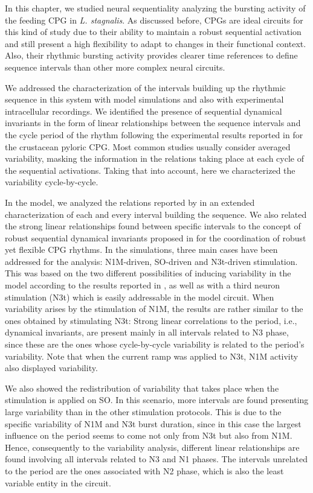 In this chapter, we studied neural sequentiality analyzing the bursting activity of the feeding CPG in \textit{L. stagnalis}. As discussed before, CPGs are ideal circuits for this kind of study due to their ability to maintain a robust sequential activation and still present a high flexibility to adapt to changes in their functional context. Also, their rhythmic bursting activity provides clearer time references to define sequence intervals than other more complex neural  circuits. 

We addressed the characterization of the intervals building up the rhythmic sequence in this system with model simulations and also with experimental intracellular recordings. We identified the presence of sequential dynamical invariants in the form of linear relationships between the sequence intervals and the cycle period of the rhythm following the experimental results reported in \textcite{elices_robust_2019} for the crustacean pyloric CPG. Most common studies usually consider averaged variability, masking the information in the relations taking place at each cycle of the sequential activations. Taking that into account, here we characterized the variability cycle-by-cycle. 

In the model, we analyzed the relations reported by \textcite{elliott_temporal_1991} in an extended characterization of each and every interval building the sequence. We also related the strong linear relationships found between specific intervals to the concept of robust sequential dynamical invariants proposed in \textcite{elices_robust_2019} for the coordination of robust yet flexible CPG rhythms. In the simulations, three main cases have been addressed for the analysis: N1M-driven, SO-driven and N3t-driven stimulation. This was based on the two different possibilities of inducing variability in the model according to the results reported in \textcite{vavoulis_dynamic_2007}, as well as with a third neuron stimulation (N3t) which is easily addressable in the model circuit. When variability arises by the stimulation of N1M, the results are rather similar to the ones obtained by stimulating N3t: Strong linear correlations to the period, i.e., dynamical invariants, are present mainly in all intervals related to N3 phase, since these are the ones whose cycle-by-cycle variability is related to the period's variability. Note that when the current ramp was applied to N3t, N1M activity also displayed variability. 

We also showed the redistribution of variability that takes place when the stimulation is applied on SO. In this scenario, more intervals are found presenting large variability than in the other stimulation protocols. This is due to the specific variability of N1M and N3t burst duration, since in this case the largest influence on the period seems to come not only from N3t but also from N1M. Hence, consequently to the variability analysis, different linear relationships are found involving all intervals related to N3 and N1 phases. The intervals unrelated to the period are the ones associated with N2 phase, which is also the least variable entity in the circuit. 

